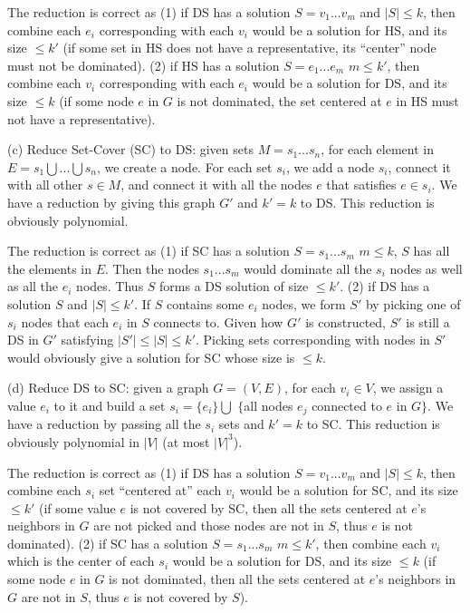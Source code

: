 \documentclass{article}
\begin{document}
\begin{description}
  The reduction is correct as (1) if DS has a solution $S = {v_1...v_m}$ and $|S| \leq k$, then combine each $e_i$ corresponding with each $v_i$ would be a solution for HS, and its size $\leq k'$ (if some set in HS does not have a representative, its ``center'' node must not be dominated). (2) if HS has a solution $S = e_1...e_m$ $m \leq k'$, then combine each $v_i$ corresponding with each $e_i$ would be a solution for DS, and its size $\leq k$ (if some node $e$ in $G$ is not dominated, the set centered at $e$ in HS must not have a representative).

  (c) Reduce Set-Cover (SC) to DS: given sets $M = s_1...s_n$, for each element in $E = s_1 \bigcup ... \bigcup s_n$, we create a node. For each set $s_i$, we add a node $s_i$, connect it with all other $s \in M$, and connect it with all the nodes $e$ that satisfies $e \in s_i$. We have a reduction by giving this graph $G'$ and $k' = k$ to DS. This reduction is obviously polynomial.

  The reduction is correct as (1) if SC has a solution $S = s_1...s_m$ $m \leq k$, $S$ has all the elements in $E$. Then the nodes $s_1...s_m$ would dominate all the $s_i$ nodes as well as all the $e_i$ nodes. Thus $S$ forms a DS solution of size $\leq k'$. (2) if DS has a solution $S$ and $|S| \leq k'$. If $S$ contains some $e_i$ nodes, we form $S'$ by picking one of $s_i$ nodes that each $e_i$ in $S$ connects to. Given how $G'$ is constructed, $S'$ is still a DS in $G'$ satisfying $|S'| \leq |S| \leq k'$. Picking sets corresponding with nodes in $S'$ would obviously give a solution for SC whose size is $\leq k$.

  (d) Reduce DS to SC: given a graph $G = (V, E)$, for each $v_i \in V$, we assign a value $e_i$ to it and build a set $s_i = \{e_i\} \bigcup$ $\{$all nodes $e_j$ connected to $e$ in $G\}$. We have a reduction by passing all the $s_i$ sets and $k' = k$ to SC. This reduction is obviously polynomial in $|V|$ (at most $|V|^3$).

  The reduction is correct as (1) if DS has a solution $S = {v_1...v_m}$ and $|S| \leq k$, then combine each $s_i$ set ``centered at'' each $v_i$ would be a solution for SC, and its size $\leq k'$ (if some value $e$ is not covered by SC, then all the sets centered at $e$'s neighbors in $G$ are not picked and those nodes are not in $S$, thus $e$ is not dominated). (2) if SC has a solution $S = s_1...s_m$ $m \leq k'$, then combine each $v_i$ which is the center of each $s_i$ would be a solution for DS, and its size $\leq k$ (if some node $e$ in $G$ is not dominated, then all the sets centered at $e$'s neighbors in $G$ are not in $S$, thus $e$ is not covered by $S$).


\end{description}
\end{document}
